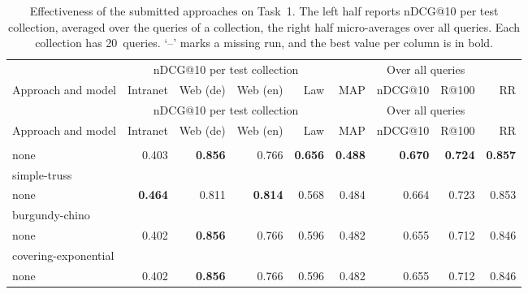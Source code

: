 {\footnotesize\setlength{\LTleft}{0pt}\setlength{\LTright}{0pt}
\begin{longtable}{@{\extracolsep{\fill}}lrrrrrrrr@{}}
\caption{Effectiveness of the submitted approaches on Task~1. The left half reports nDCG@10 per test collection, averaged over the queries of a collection, the right half micro-averages over all queries. Each collection has 20~queries. `--' marks a missing run, and the best value per column is in bold.}
\label{tab:task-01} \\
\toprule
& \multicolumn{4}{c}{nDCG@10 per test collection} & \multicolumn{4}{c}{Over all queries} \\
\cmidrule(lr){2-5}\cmidrule(lr){6-9}
Approach and model & Intranet & Web (de) & Web (en) & Law & MAP & nDCG@10 & R@100 & RR \\
\midrule
\endfirsthead
\toprule
& \multicolumn{4}{c}{nDCG@10 per test collection} & \multicolumn{4}{c}{Over all queries} \\
\cmidrule(lr){2-5}\cmidrule(lr){6-9}
Approach and model & Intranet & Web (de) & Web (en) & Law & MAP & nDCG@10 & R@100 & RR \\
\midrule
\endhead
\bottomrule
\endfoot
\multicolumn{9}{l}{parallel-grouse} \\*
\quad none & 0.403 & \textbf{0.856} & 0.766 & \textbf{0.656} & \textbf{0.488} & \textbf{0.670} & \textbf{0.724} & \textbf{0.857} \\
\midrule
\multicolumn{9}{l}{simple-truss} \\*
\quad none & \textbf{0.464} & 0.811 & \textbf{0.814} & 0.568 & 0.484 & 0.664 & 0.723 & 0.853 \\
\midrule
\multicolumn{9}{l}{burgundy-chino} \\*
\quad none & 0.402 & \textbf{0.856} & 0.766 & 0.596 & 0.482 & 0.655 & 0.712 & 0.846 \\
\midrule
\multicolumn{9}{l}{covering-exponential} \\*
\quad none & 0.402 & \textbf{0.856} & 0.766 & 0.596 & 0.482 & 0.655 & 0.712 & 0.846 \\
\end{longtable}
}

